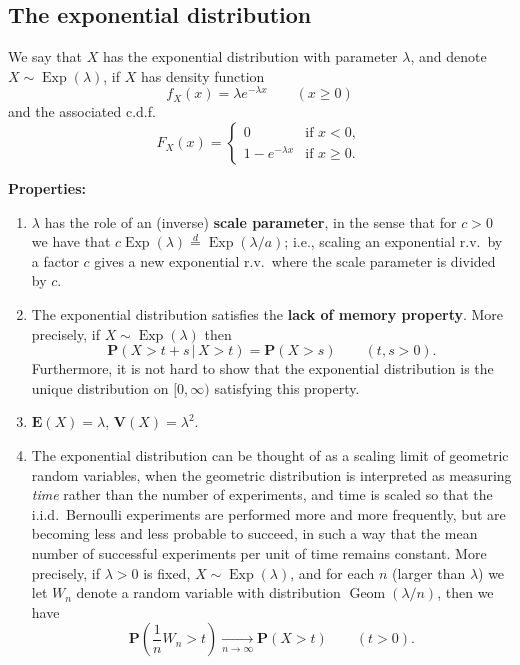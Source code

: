 \documentclass[12pt]{article}
\newcommand{\prob}{\mathbf{P}}
\newcommand{\expec}{\mathbf{E}}
\newcommand{\var}{\mathbf{V}}
\newcommand{\eqdist}{\stackrel{d}{=}}
\newcommand{\geomdist}{\operatorname{Geom}}
\newcommand{\expdist}{\operatorname{Exp}}
\theoremstyle{example}
\begin{document}
\subsection{The exponential distribution}

\label{sec:exp-dist}

We say that $X$ has the exponential distribution with parameter $\lambda$, and denote $X\sim \expdist(\lambda)$, if $X$ has density function
$$
f_X(x) = \lambda e^{-\lambda x} \qquad (x\ge 0)
$$
and the associated c.d.f.
$$
F_X(x) = \begin{cases} 0 & \textrm{if }x<0, \\
1-e^{-\lambda x} & \textrm{if }x\ge 0.
\end{cases}
$$

\noindent \textbf{Properties:}
\begin{enumerate}

\item $\lambda$ has the role of an (inverse) \textbf{scale parameter}, in the sense that for $c>0$ we have that $c \expdist(\lambda) \eqdist \expdist(\lambda / a)$; i.e., scaling an exponential r.v.\ by a factor $c$ gives a new exponential r.v.\ where the scale parameter is divided by $c$.

\item The exponential distribution satisfies the \textbf{lack of memory property}. More precisely, if $X\sim \expdist(\lambda)$ then
$$ \prob(X > t+s \,|\, X>t) = \prob(X>s) \qquad (t,s>0). $$
Furthermore, it is not hard to show that the exponential distribution is the unique distribution on $[0,\infty)$ satisfying this property.

\item $\expec(X) = \lambda$, $\var(X) = \lambda^2$.

\item The exponential distribution can be thought of as a scaling limit of geometric random variables, when the geometric distribution is interpreted as measuring \emph{time} rather than the number of experiments, and time is scaled so that the i.i.d.\ Bernoulli experiments are performed more and more frequently, but are becoming less and less probable to succeed, in such a way that the mean number of successful experiments per unit of time remains constant. More precisely, if $\lambda>0$ is fixed, $X\sim \expdist(\lambda)$, and for each $n$ (larger than $\lambda$) we let $W_n$ denote a random variable with distribution $\geomdist(\lambda/n)$, then we have
$$ \prob\left(\frac{1}{n} W_n > t\right)  \xrightarrow[n\to\infty]{} \prob(X > t) \qquad (t>0). $$


\end{enumerate}
\end{document}
